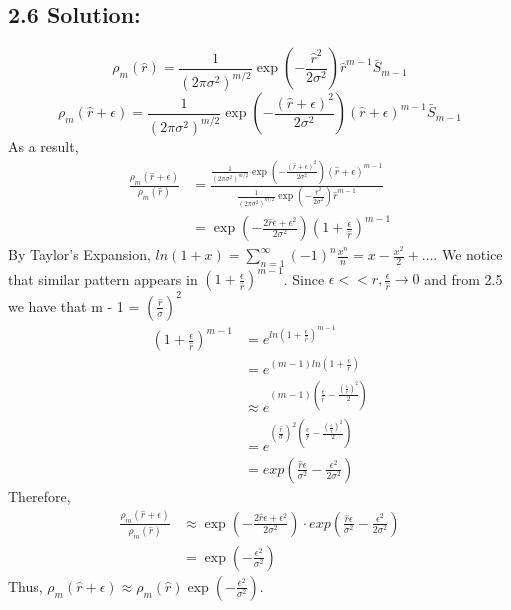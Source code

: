\documentclass{article}
\begin{document}
\subsection*{2.6 Solution:}
\[\rho_m(\hat{r}) = \frac{1}{(2\pi\sigma^2)^{m/2}}\exp(-\frac{\hat{r}^2}{2\sigma^2}) \hat{r}^{m-1} \bar{S}_{m-1}\]
\[\rho_m(\hat{r} + \epsilon) = \frac{1}{(2\pi\sigma^2)^{m/2}}\exp(-\frac{(\hat{r} + \epsilon)^2}{2\sigma^2}) (\hat{r} + \epsilon)^{m-1} \bar{S}_{m-1}\]
As a result, 
\begin{align*}
    \frac{\rho_m(\hat{r} + \epsilon)}{\rho_m(\hat{r})} &= \frac{\frac{1}{(2\pi\sigma^2)^{m/2}}\exp(-\frac{(\hat{r} + \epsilon)^2}{2\sigma^2}) (\hat{r} + \epsilon)^{m-1}}{\frac{1}{(2\pi\sigma^2)^{m/2}}\exp(-\frac{\hat{r}^2}{2\sigma^2}) \hat{r}^{m-1}} \\
                                                       &= \exp(-\frac{2 \hat{r} \epsilon + \epsilon^2}{2 \sigma^2}) (1 + \frac{\epsilon}{\hat{r}})^{m-1}                                       
\end{align*}
By Taylor's Expansion, $ln(1+x) = \sum_{n=1}^{\infty} (-1)^n \frac{x^n}{n} = x - \frac{x^2}{2} + \dots$. We notice that similar pattern appears in $(1 + \frac{\epsilon}{\hat{r}})^{m-1}$. Since $\epsilon << \hat{r}, \frac{\epsilon}{\hat{r}} \to 0$ and from 2.5 we have that m - 1 = $(\frac{\hat{r}}{\sigma})^2$
\begin{align*}
    (1 + \frac{\epsilon}{\hat{r}})^{m-1}  &= e^{ln (1 + \frac{\epsilon}{\hat{r}})^{m-1}} \\
                                          &= e^{(m - 1) ln (1 + \frac{\epsilon}{\hat{r}})} \\
                                          &\approx e^{(m - 1) (\frac{\epsilon}{\hat{r}} - \frac{(\frac{\epsilon}{\hat{r}})^2}{2})} \\
                                          &= e^{(\frac{\hat{r}}{\sigma})^2 (\frac{\epsilon}{\hat{r}} - \frac{(\frac{\epsilon}{\hat{r}})^2}{2})} \\
                                          &= exp(\frac{\hat{r} \epsilon}{\sigma^2} - \frac{\epsilon^2}{2 \sigma^2})
\end{align*}  
Therefore,  
\begin{align*}
    \frac{\rho_m(\hat{r} + \epsilon)}{\rho_m(\hat{r})} &\approx \exp(-\frac{2 \hat{r} \epsilon + \epsilon^2}{2 \sigma^2}) \cdot exp(\frac{\hat{r} \epsilon}{\sigma^2} - \frac{\epsilon^2}{2 \sigma^2}) \\
                                                       &= \exp(-\frac{\epsilon^2}{\sigma^2})
\end{align*}
Thus, $\rho_m(\hat{r} + \epsilon) \approx \rho_m(\hat{r}) \exp(-\frac{\epsilon^2}{\sigma^2})$.
\end{document}
